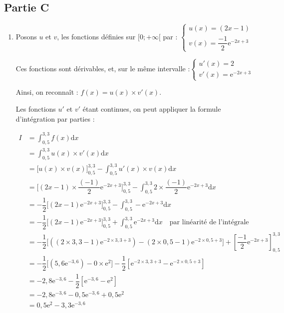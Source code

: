\documentclass[10pt]{article}
\providecommand{\e}{{\mathrm{e}}}
\renewcommand{\d}{{\mathrm{d}}}
\providecommand{\ds}{\displaystyle}
\begin{document}
\subsection*{Partie C}
	\begin{enumerate}
		\item Posons $u$ et $v$, les fonctions définies sur $[0 ; + \infty[$ par : \quad $\begin{cases}
			u(x) = (2x - 1)\\
			v(x) = \dfrac{-1}{2}\e^{-2x+3}
		\end{cases}$

		Ces fonctions sont dérivables, et, sur le même intervalle :\quad $\begin{cases}
			u'(x) = 2\\
			v'(x) = \e^{-2x+3}
			\end{cases}$

		Ainsi, on reconnaît : \quad $f(x) = u(x)\times v'(x)$.

		Les fonctions $u'$ et $v'$ étant continues, on peut appliquer la formule d'intégration par parties :

		$\begin{aligned} \ds
			I &= \int_{0,5}^{3,3} f(x) \d x\\
				&= \int_{0,5}^{3,3} u(x)\times v'(x) \d x\\
				&= \Big[u(x) \times v(x)\Big]_{0,5}^{3,3} - \int_{0,5}^{3,3} u'(x)\times v(x) \d x\\
				&= \Big[(2x-1) \times \dfrac{(-1)}{2}\e^{-2x+3}\Big]_{0,5}^{3,3} - \int_{0,5}^{3,3} 2\times \dfrac{(-1)}{2}\e^{-2x+3} \d x\\
				&= -\dfrac{1}{2} \Big[(2x-1)\e^{-2x+3}\Big]_{0,5}^{3,3} - \int_{0,5}^{3,3} -\e^{-2x+3} \d x\\
				&= -\dfrac{1}{2} \Big[(2x-1)\e^{-2x+3}\Big]_{0,5}^{3,3} + \int_{0,5}^{3,3} \e^{-2x+3} \d x\quad \text{par linéarité de l'intégrale}\\
				&= -\dfrac{1}{2} \Big[\left( (2\times 3,3-1)\e^{-2\times 3,3+3}\right) - (2\times 0,5 - 1)\e^{-2\times 0,5 + 3}\Big] + \left[\dfrac{-1}{2}  \e^{-2x+3}\right]_{0,5}^{3,3}\\
				&= -\dfrac{1}{2} \Big[\left( 5,6\e^{-3,6}\right) - 0\times \e^{2}\Big] -\dfrac{1}{2} \left[\e^{-2\times 3,3+3} - \e^{-2\times 0,5 + 3}\right]\\
				&= -2,8\e^{-3,6} -\dfrac{1}{2} \left[\e^{-3,6} - \e^{2}\right]\\
				&= -2,8\e^{-3,6} - 0,5\e^{-3,6} +0,5 \e^{2}\\
				&= 0,5\e^{2} - 3,3\e^{-3,6}
		\end{aligned}$


\end{enumerate}
\end{document}
